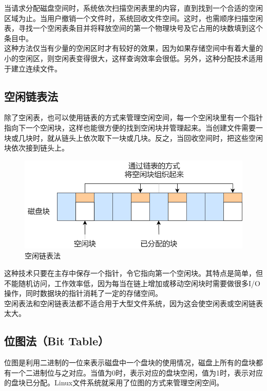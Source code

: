 当请求分配磁盘空间时，系统依次扫描空闲表里的内容，直到找到一个合适的空闲区域为止。当用户撤销一个文件时，系统回收文件空间。这时，也需顺序扫描空闲表，寻找一个空闲表条目并将释放空间的第一个物理块号及它占用的块数填到这个条目中。\\

这种方法仅当有少量的空闲区时才有较好的效果，因为如果存储空间中有着大量的小的空闲区，则空闲表变得很大，这样查询效率会很低。另外，这种分配技术适用于建立连续文件。\\

\subsection{空闲链表法}

除了空闲表，也可以使用链表的方式来管理空闲空间，每一个空闲块里有一个指针指向下一个空闲块，这样也能很方便的找到空闲块并管理起来。当创建文件需要一块或几块时，就从链头上依次取下一块或几块。反之，当回收空间时，把这些空闲块依次接到链头上。

\begin{figure}[H]
	\centering
	\includegraphics[scale=0.5]{img/Chapter5/5-5/2.png}
	\caption{空闲链表法}
\end{figure}

这种技术只要在主存中保存一个指针，令它指向第一个空闲块。其特点是简单，但不能随机访问，工作效率低，因为每当在链上增加或移动空闲块时需要做很多I/O操作，同时数据块的指针消耗了一定的存储空间。\\

空闲表法和空闲链表法都不适合用于大型文件系统，因为这会使空闲表或空闲链表太大。\\

\subsection{位图法（Bit Table）}

位图是利用二进制的一位来表示磁盘中一个盘块的使用情况，磁盘上所有的盘块都有一个二进制位与之对应。当值为0时，表示对应的盘块空闲，值为1时，表示对应的盘块已分配。Linux文件系统就采用了位图的方式来管理空闲空间。\\

\newpage